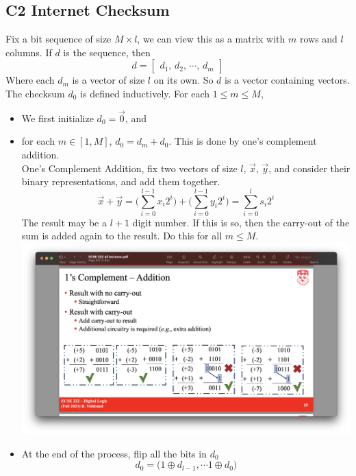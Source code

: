 \documentclass[../../main.tex]{subfiles}
\begin{document}
\subsection{C2 Internet Checksum}
\begin{definition}
    Fix a bit sequence of size $M\times l$, we can view this as a matrix with $m$ rows and $l$ columns. If $d$ is the sequence, then
    \[d = \begin{bmatrix}d_1,\, d_2,\,\cdots,\,d_m\end{bmatrix}\]
    Where each $d_m$ is a vector of size $l$ on its own. So $d$ is a vector containing vectors.\\
    
    The checksum $d_0$ is defined inductively. For each $1\leq m\leq M$,
    \begin{itemize}
        \item We first initialize $d_0 = \vec{0}$, and
        \item for each $m\in[1,M]$, $d_0 = d_m + d_0$. This is done by one's complement addition.\\
        
        One's Complement Addition, fix two vectors of size $l$, $\vec{x}$, $\vec{y}$, and consider their binary representations, and add them together.
        \[
        \vec{x} + \vec{y} = \biggl(\sum_{i=0}^{l-1} x_i 2^i\biggr) + \biggl(\sum_{i=0}^{l-1} y_i 2^i\biggr) = \sum_{i=0}^{l} s_i 2^i
        \]
        The result may be a $l+1$ digit number. If this is so, then the carry-out of the sum is added again to the result. Do this for all $m\leq M$.\\
        \includegraphics[width=\textwidth]{images/ones_complement_addition.png}
        \item At the end of the process, flip all the bits in $d_0$
        \[
        d_0 = \biggl(1\oplus d_{l-1},\cdots 1\oplus d_{0}\biggr)
        \]
    \end{itemize}
\end{definition}
\end{document}
